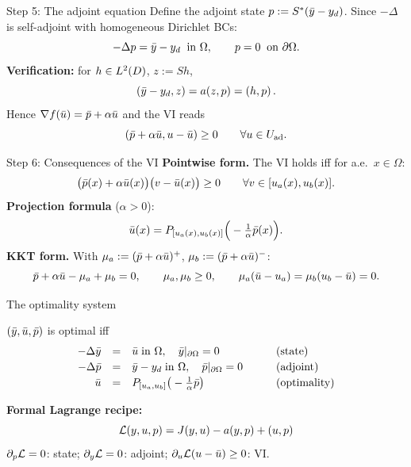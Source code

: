\documentclass[main.tex]{subfiles}
\begin{document}
\begin{frame}{Step 5: The adjoint equation}
  Define the adjoint state $p := S^*(\bar y - y_d)$. Since $-\Delta$ is self-adjoint with homogeneous Dirichlet BCs:
  \[
    -\Delta p = \bar y - y_d \;\;\text{in } \Omega, \qquad p = 0 \;\;\text{on } \partial\Omega .
  \]
  \textbf{Verification:} for $h \in L^2(D)$, $z := Sh$,
  \[
    \left( \bar y - y_d, z \right) = a(z,p) = \left( h, p \right) .
  \]
  Hence $\nabla f(\bar u) = \bar p + \alpha \bar u$ and the VI reads
  \[
    \left( \bar p + \alpha\bar u, u - \bar u \right) \ge 0 \qquad \forall u \in U_{\mathrm{ad}} .
  \]
\end{frame}

\begin{frame}{Step 6: Consequences of the VI}
  \textbf{Pointwise form.} The VI holds iff for a.e.\ $x \in \Omega$:
  \[
    \big(\bar p(x) + \alpha\bar u(x)\big)\big(v - \bar u(x)\big) \ge 0 \qquad \forall v \in [u_a(x),u_b(x)] .
  \]
  \textbf{Projection formula} ($\alpha > 0$):
  \[
    \bar u(x) = P_{[u_a(x),u_b(x)]}\Big(-\tfrac{1}{\alpha}\bar p(x)\Big) .
  \]
  \textbf{KKT form.} With $\mu_a := (\bar p + \alpha\bar u)^+$, $\mu_b := (\bar p + \alpha\bar u)^-$:
  \[
    \bar p + \alpha\bar u - \mu_a + \mu_b = 0, \qquad \mu_a,\mu_b \ge 0, \qquad
    \mu_a(\bar u - u_a) = \mu_b(u_b - \bar u) = 0 .
  \]
\end{frame}

\begin{frame}{The optimality system}
  \begin{block}{$(\bar y,\bar u,\bar p)$ is optimal iff}
    \[
      \begin{array}{rcll}
        -\Delta \bar y &=& \bar u \;\text{in }\Omega, \quad \bar y|_{\partial\Omega} = 0 & \qquad\text{(state)}\\[0.5ex]
        -\Delta \bar p &=& \bar y - y_d \;\text{in }\Omega, \quad \bar p|_{\partial\Omega} = 0 & \qquad\text{(adjoint)}\\[0.5ex]
        \bar u &=& P_{[u_a,u_b]}\big(-\tfrac{1}{\alpha}\bar p\big) & \qquad\text{(optimality)}
      \end{array}
    \]
  \end{block}
  \textbf{Formal Lagrange recipe:}
  \[
    \mathcal{L}(y,u,p) = J(y,u) - a(y,p) + \left( u, p \right)
  \]
  $\partial_p\mathcal{L} = 0$: state; \quad $\partial_y\mathcal{L} = 0$: adjoint; \quad $\partial_u\mathcal{L}(u - \bar u) \ge 0$: VI.
\end{frame}
\end{document}
